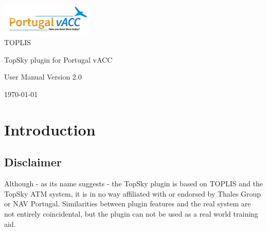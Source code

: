\documentclass[11pt,a4paper]{memoir}
\begin{document}
%
%
\thispagestyle{empty}

{%
\sffamily

\centering
\Large

~\vspace{\fill}

{\huge 
\includegraphics{img/logo.png}\\
TOPLIS
}

\vspace{2.5cm}

{\LARGE
TopSky plugin for Portugal vACC
}

\vspace{3.5cm}

User Manual
\medskip
Version 2.0
\medskip

\vspace{\fill}

\coverdate\today

}%

\cleardoublepage

\tableofcontents*

\clearpage


\chapter{Introduction}

\section{Disclaimer}
Although - as its name suggests - the TopSky plugin is based on TOPLIS and the TopSky ATM system, it is in no way affiliated with or endorsed by Thales Group or NAV Portugal. Similarities between plugin features and the real system are not entirely coincidental, but the plugin can not be used as a real world training aid.
\end{document}
